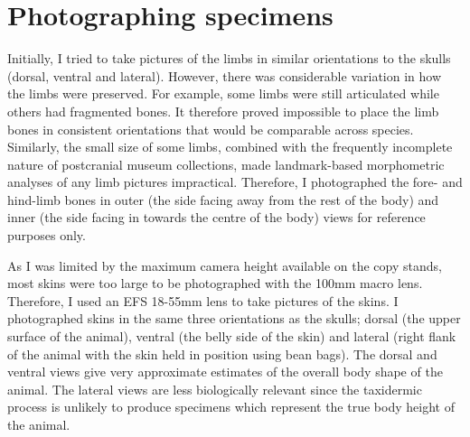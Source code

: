 
\section{Photographing specimens}

	Initially, I tried to take pictures of the limbs in similar orientations to the skulls (dorsal, ventral and lateral). However, there was considerable variation in how the limbs were preserved. For example, some limbs were still articulated while others had fragmented bones. It therefore proved impossible to place the limb bones in consistent orientations that would be comparable across species. Similarly, the small size of some limbs, combined with the frequently incomplete nature of postcranial museum collections, made landmark-based morphometric analyses of any limb pictures impractical. Therefore, I photographed the fore- and hind-limb bones in outer (the side facing away from the rest of the body) and inner (the side facing in towards the centre of the body) views for reference purposes only.

	As I was limited by the maximum camera height available on the copy stands, most skins were too large to be photographed with the 100mm macro lens. Therefore, I used an EFS 18-55mm lens to take pictures of the skins. I photographed skins in the same three orientations as the skulls; dorsal (the upper surface of the animal), ventral (the belly side of the skin) and lateral (right flank of the animal with the skin held in position using bean bags). The dorsal and ventral views give very approximate estimates of the overall body shape of the animal. The lateral views are less biologically relevant since the taxidermic process is unlikely to produce specimens which represent the true body height of the animal.

